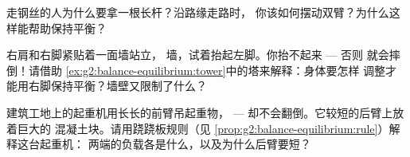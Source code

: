 \begin{exercise}[$\star$]\label{exo:g2:balance-equilibrium:8}
走钢丝的人为什么要拿一根长杆？沿路缘走路时，
你该如何摆动双臂？为什么这样能帮助保持平衡？
\end{exercise}

\begin{exercise}[$\star$]\label{exo:g2:balance-equilibrium:9}
右肩和右脚紧贴着一面墙站立，
墙，试着抬起左脚。你抬不起来 --- 否则
就会摔倒！请借助
\cref{ex:g2:balance-equilibrium:tower}中的塔来解释：身体要怎样
调整才能用右脚保持平衡？墙壁又限制了什么？
\end{exercise}

\begin{exercise}[$\star\star$]\label{exo:g2:balance-equilibrium:10}
建筑工地上的起重机用长长的前臂吊起重物，
--- 却不会翻倒。它较短的后臂上放着巨大的
混凝土块。请用跷跷板规则（见
\cref{prop:g2:balance-equilibrium:rule}）解释这台起重机：
两端的负载各是什么，以及为什么后臂要短？
\end{exercise}
